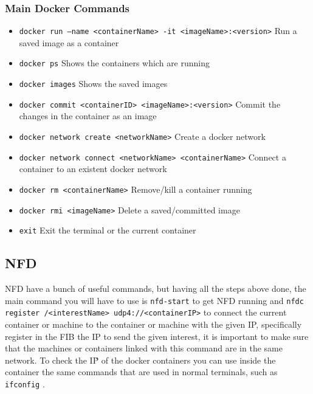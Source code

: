 \documentclass[11pt,conference]{./IEEEtran}
\begin{document}
\subsubsection{Main Docker Commands}
\begin{itemize}
 \item \texttt{docker run --name <containerName> -it <imageName>:<version>}
 Run a saved image as a container
 \item \texttt{docker ps}
 Shows the containers which are running
 \item \texttt{docker images}
 Shows the saved images
 \item \texttt{docker commit <containerID>  <imageName>:<version>}
 Commit the changes in the container as an image
 \item \texttt{docker network create <networkName>}
 Create a docker network
 \item \texttt{docker network connect <networkName> <containerName>}
 Connect a container to an existent docker network
 \item \texttt{docker rm <containerName>}
 Remove/kill a container running
 \item \texttt{docker rmi <imageName>}
 Delete a saved/committed image
 \item \texttt{exit} 
 Exit the terminal or the current container
\end{itemize}


\subsection{NFD}
NFD have a bunch of useful commands, but having all the steps above done, the main command you will have to use is \texttt{nfd-start} to get NFD running and \texttt{nfdc register /<interestName> udp4://<containerIP>} to connect the current container or machine to the container or machine with the given IP, specifically register in the FIB the IP to send the given interest, it is important to make sure that the machines or containers linked with this command are in the same network.
To check the IṔ of the docker containers you can use inside the container the same commands that are used in normal terminals, such as \texttt{ifconfig} .
\end{document}
